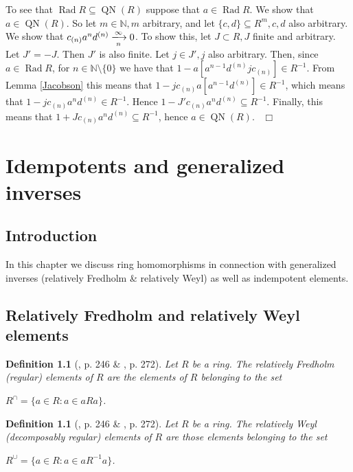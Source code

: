 \documentclass[12pt, oneside]{book}
\newtheorem{definition}[theorem]{Definition}
\newcommand{\qed}{\hfill ~$\Box$\\}
\def\Rad{\operatorname{Rad}}
\def\QN{\operatorname{QN}}
\begin{document}
\medskip \noindent To see that $\Rad R \subseteq \QN(R)$ suppose that $a \in \Rad R$. 
We show that $a \in \QN(R)$. So let $m \in \mathbb{N}, m$ arbitrary, and let 
$\{c, d\} \subseteq R^m, c, d$ also arbitrary. We show that 
$c_{(n)} a^n d^{(n)} \xlongrightarrow[n]{\infty} 0$. 
To show this, let $J \subset R, J$ finite and arbitrary. Let $J' = -J$. 
Then $J'$ is also finite. Let $j \in J', j$ also arbitrary. Then, since $a \in \Rad R$, for 
$n \in \mathbb{N} \setminus \{0\}$ we have that $1 - a[a^{n-1}d^{(n)}jc_{(n)}] \in R^{-1}$. 
From Lemma \ref{Jacobson} this means that $1 - jc_{(n)}a[a^{n-1}d^{(n)}] \in R^{-1}$, which means that
$1 - jc_{(n)}a^nd^{(n)} \in R^{-1}$. Hence $1 - J'c_{(n)}a^nd^{(n)} \subseteq R^{-1}$. 
Finally, this means that $1 + Jc_{(n)}a^nd^{(n)} \subseteq R^{-1}$, hence $a \in \QN(R)$.
\qed
\vskip 2cm
\begin{center}
\maltese
\end{center}


\chapter{Idempotents and \newline generalized inverses}

\section{Introduction}

In this chapter we discuss ring homomorphisms in connection with generalized inverses (relatively Fredholm \& relatively Weyl) as well as indempotent elements.


\section{Relatively Fredholm and relatively Weyl elements}


\begin{definition}[\cite{H1}, p. 246 \& \cite{CH3}, p. 272] 
\normalfont
\noindent Let $R$ be a ring. The {\sl relatively Fredholm (regular)} elements of $R$ are the 
elements of $R$ belonging to the set
\begin{center}
$R^{\cap}=\{ a \in R: a\in aRa \}$.
\end{center}
\end{definition}

\begin{definition}[\cite{H1}, p. 246 \& \cite{CH3}, p. 272] 
\normalfont
\noindent Let $R$ be a ring. The {\sl relatively Weyl (decomposably regular)} elements of $R$ are 
those elements belonging to the set
\begin{center}
$R^{\cup}=\{ a \in R: a\in aR^{-1}a \}$.
\end{center}
\end{definition}
\end{document}
